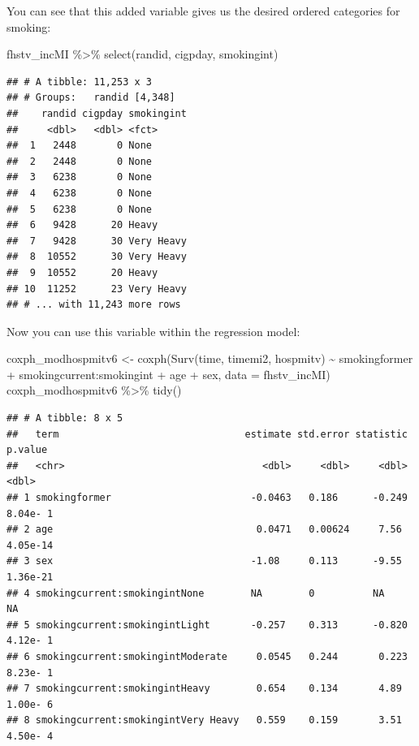 \documentclass[
]{book}
\newenvironment{Shaded}{\begin{snugshade}}{\end{snugshade}}
\newcommand{\AttributeTok}[1]{\textcolor[rgb]{0.77,0.63,0.00}{#1}}
\newcommand{\FunctionTok}[1]{\textcolor[rgb]{0.00,0.00,0.00}{#1}}
\newcommand{\NormalTok}[1]{#1}
\newcommand{\OtherTok}[1]{\textcolor[rgb]{0.56,0.35,0.01}{#1}}
\newcommand{\SpecialCharTok}[1]{\textcolor[rgb]{0.00,0.00,0.00}{#1}}
\begin{document}
You can see that this added variable gives us the desired ordered categories for smoking:

\begin{Shaded}
\begin{Highlighting}[]
\NormalTok{fhstv\_incMI }\SpecialCharTok{\%\textgreater{}\%} 
  \FunctionTok{select}\NormalTok{(randid, cigpday, smokingint)}
\end{Highlighting}
\end{Shaded}

\begin{verbatim}
## # A tibble: 11,253 x 3
## # Groups:   randid [4,348]
##    randid cigpday smokingint
##     <dbl>   <dbl> <fct>     
##  1   2448       0 None      
##  2   2448       0 None      
##  3   6238       0 None      
##  4   6238       0 None      
##  5   6238       0 None      
##  6   9428      20 Heavy     
##  7   9428      30 Very Heavy
##  8  10552      30 Very Heavy
##  9  10552      20 Heavy     
## 10  11252      23 Very Heavy
## # ... with 11,243 more rows
\end{verbatim}

Now you can use this variable within the regression model:

\begin{Shaded}
\begin{Highlighting}[]
\NormalTok{coxph\_modhospmitv6 }\OtherTok{\textless{}{-}} \FunctionTok{coxph}\NormalTok{(}\FunctionTok{Surv}\NormalTok{(time, timemi2, hospmitv) }\SpecialCharTok{\textasciitilde{}} 
\NormalTok{                              smokingformer }\SpecialCharTok{+}\NormalTok{ smokingcurrent}\SpecialCharTok{:}\NormalTok{smokingint }\SpecialCharTok{+}\NormalTok{ age }\SpecialCharTok{+}\NormalTok{ sex, }
                            \AttributeTok{data =}\NormalTok{ fhstv\_incMI)}
\NormalTok{coxph\_modhospmitv6 }\SpecialCharTok{\%\textgreater{}\%}
  \FunctionTok{tidy}\NormalTok{()}
\end{Highlighting}
\end{Shaded}

\begin{verbatim}
## # A tibble: 8 x 5
##   term                                estimate std.error statistic   p.value
##   <chr>                                  <dbl>     <dbl>     <dbl>     <dbl>
## 1 smokingformer                        -0.0463   0.186      -0.249  8.04e- 1
## 2 age                                   0.0471   0.00624     7.56   4.05e-14
## 3 sex                                  -1.08     0.113      -9.55   1.36e-21
## 4 smokingcurrent:smokingintNone        NA        0          NA     NA       
## 5 smokingcurrent:smokingintLight       -0.257    0.313      -0.820  4.12e- 1
## 6 smokingcurrent:smokingintModerate     0.0545   0.244       0.223  8.23e- 1
## 7 smokingcurrent:smokingintHeavy        0.654    0.134       4.89   1.00e- 6
## 8 smokingcurrent:smokingintVery Heavy   0.559    0.159       3.51   4.50e- 4
\end{verbatim}
\end{document}
